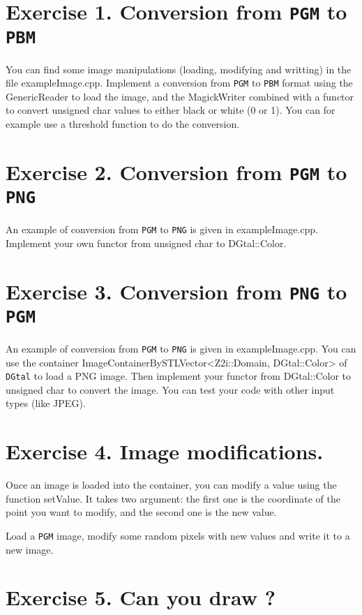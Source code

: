\documentclass[a4paper, 11pt]{article}
\begin{document}
\section*{\bf Exercise 1. \rm Conversion from \texttt{PGM} to \texttt{PBM}}

You can find some image manipulations (loading, modifying and writting) in the file exampleImage.cpp.
Implement a conversion from \texttt{PGM} to \texttt{PBM} format using the GenericReader to load the image,
and the MagickWriter combined with a functor to convert unsigned char values to either black or white (0 or 1).
You can for example use a threshold function to do the conversion.

\section*{\bf Exercise 2. \rm Conversion from \texttt{PGM} to \texttt{PNG}}

An example of conversion from \texttt{PGM} to \texttt{PNG} is given in exampleImage.cpp.
Implement your own functor from unsigned char to DGtal::Color.

\section*{\bf Exercise 3. \rm Conversion from \texttt{PNG} to \texttt{PGM}}

An example of conversion from \texttt{PGM} to \texttt{PNG} is given in exampleImage.cpp.
You can use the container ImageContainerBySTLVector<Z2i::Domain, DGtal::Color> of \texttt{DGtal} to load a PNG image.
Then implement your functor from DGtal::Color to unsigned char to convert the image.
You can test your code with other input types (like JPEG).

\section*{\bf Exercise 4. \rm Image modifications.}

Once an image is loaded into the container, you can modify a value using the function setValue.
It takes two argument: the first one is the coordinate of the point you want to modify, and the second one is the new value.

Load a \texttt{PGM} image, modify some random pixels with new values and write it to a new image.

\section*{\bf Exercise 5. \rm Can you draw ?}
\end{document}
